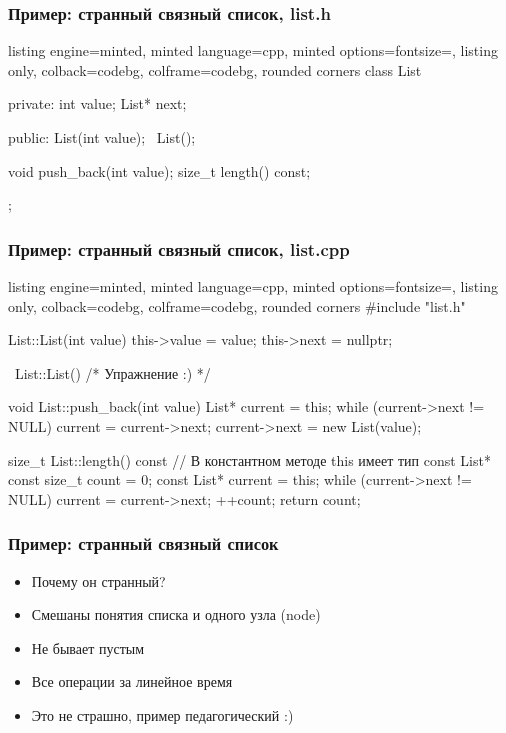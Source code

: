 \documentclass[10pt]{beamer}
\begin{document}
\begin{frame}[fragile]
\frametitle{Пример: странный связный список, list.h}
\begin{itemize}
\begin{tcblisting}{listing engine=minted, minted language=cpp, minted options={fontsize=\scriptsize}, listing only, colback=codebg, colframe=codebg, rounded corners}
class List {
private:
  int value;
  List* next;

public:
  List(int value);
  ~List();

  void push_back(int value);
  size_t length() const;
};
\end{tcblisting}
\end{itemize}
\end{frame}

\begin{frame}[fragile]
\frametitle{Пример: странный связный список, list.cpp}
\begin{itemize}
\begin{tcblisting}{listing engine=minted, minted language=cpp, minted options={fontsize=\scriptsize}, listing only, colback=codebg, colframe=codebg, rounded corners}
#include "list.h"

List::List(int value) {
  this->value = value; this->next = nullptr;
}

~List::List() { /* Упражнение :) */ }

void List::push_back(int value) {
  List* current = this;
  while (current->next != NULL)
    current = current->next;
  current->next = new List(value);
}

size_t List::length() const {
  // В константном методе this имеет тип const List* const
  size_t count = 0; const List* current = this;
  while (current->next != NULL) {
    current = current->next; ++count;
  }
  return count;
}
\end{tcblisting}
\end{itemize}
\end{frame}

\begin{frame}[fragile]
\frametitle{Пример: странный связный список}
\begin{itemize}
\item Почему он странный?
\pause
\item Смешаны понятия списка и одного узла (node)
\pause
\item Не бывает пустым
\pause
\item Все операции за линейное время
\pause
\item Это не страшно, пример педагогический :)
\end{itemize}
\end{frame}
\end{document}
